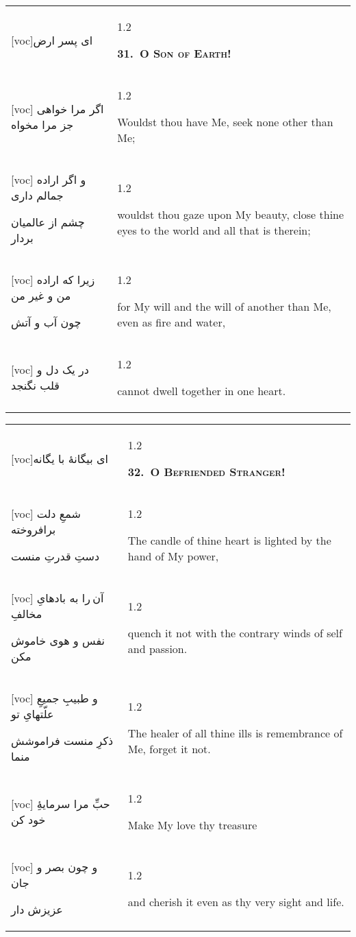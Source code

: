 \documentclass[11pt]{article}
\makeatletter
\newenvironment{orig}
  {\begin{farsi}[voc]}
  {\end{farsi}}
\newenvironment{trans}
  {\Large\begin{spacing}{1.2}\raggedright}
  {\end{spacing}}
\newenvironment{word}
  {\begin{tabular}[t]{p{2.75in}@{\hspace{3em}}p{2.875in}}}
  {\end{tabular}}
\newcommand{\ayat}[2]{\begin{orig}#1\end{orig} & \begin{trans}#2\end{trans}}
\newcommand{\heading}[2]{\textsc{\textbf{#1}} %
}
\makeatother
\begin{document}
\begin{word}
\ayat{ای پسر ارض}{\heading{31.~O Son of Earth!}{}} \\ \ayat{
اگر مرا خواهی جز مرا مخواه
}{Wouldst thou have Me, seek none other than Me;} \vspace{-1ex}\\ \ayat{
و اگر اراده جمالم داری

چشم از عالميان بردار
}{wouldst thou gaze upon My beauty, close thine eyes to the world and all that
  is therein;} \vspace{-1ex}\\ \ayat{
زيرا که اراده من و غير من

چون آب و آتش
}{for My will and the will of another than Me, even as fire and water,} \vspace{-1ex}\\ \ayat{
در يک دل و قلب نگنجد
}{cannot dwell together in one heart.}
\end{word}

\pagebreak

\begin{word}
\ayat{ای بيگانۀ با يگانه}{\heading{32.~O Befriended Stranger!}{}} \\ \ayat{
شمعِ دلت برافروخته

دستِ قدرتِ منست
}{The candle of thine heart is lighted by the hand of My power,} \\ \ayat{
آن را به بادهایِ مخالفِ

نفس و هوی خاموش مکن
}{quench it not with the contrary winds of self and passion.} \\ \ayat{
و طبيبِ جميعِ علّتهایِ تو

ذکرِ منست فراموشش منما
}{The healer of all thine ills is remembrance of Me, forget it not.} \\ \ayat{
حبِّ مرا سرمايۀِ خود کن
}{Make My love thy treasure} \vspace{-1ex}\\ \ayat{
و چون بصر و جان

عزيزش دار
}{and cherish it even as thy very sight and life.}
\end{word}

\pagebreak
\end{document}
